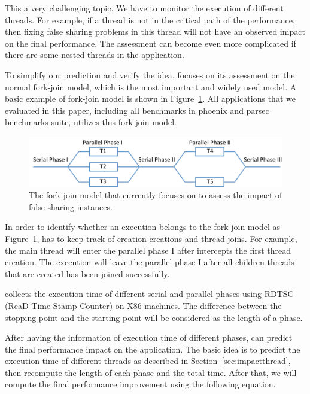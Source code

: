 This a very challenging topic.  We have to monitor the execution of different threads. For example, if a thread is not in the critical path of the performance, then fixing false sharing problems in this thread will not have an observed impact on the final performance. The assessment can become even more complicated if there are some nested threads in the application. 

To simplify our prediction and verify the idea, \cheetah{} focuses on its assessment on the normal fork-join model, which is the most important and widely used model. A basic example of fork-join model is shown in  Figure~\ref{fig:forkjoinmodel}. All applications that we evaluated in this paper, including all benchmarks in phoenix and parsec benchmarks suite, utilizes this fork-join model. 

\begin{figure}[ht!]
\begin{center}
\includegraphics[width=6in]{figure/forkjoin}
\end{center}
\caption{The fork-join model that \Cheetah{} currently focuses on to assess the impact of false sharing instances. 
\label{fig:forkjoinmodel}}
\end{figure}

In order to identify whether an execution belongs to the fork-join model as Figure~\ref{fig:forkjoinmodel}, \cheetah{} has to keep track of creation creations and thread joins. For example, the main thread will enter the parallel phase I after \cheetah{} intercepts the first thread creation. The execution will leave the parallel phase I after all children threads that are created has been joined successfully. 

\Cheetah{} collects the execution time of different serial and parallel phases using RDTSC (ReaD-Time Stamp Counter) on X86 machines. The difference between the stopping point and the starting point will be considered as the length of a phase. 

After having the information of execution time of different phases, \cheetah{} can predict the final performance impact on the application. The basic idea is to predict the execution time of different threads as described in Section~\ref{sec:impactthread}, then recompute the length of each phase and the total time. After that, we will compute the final performance improvement using the following equation. 

